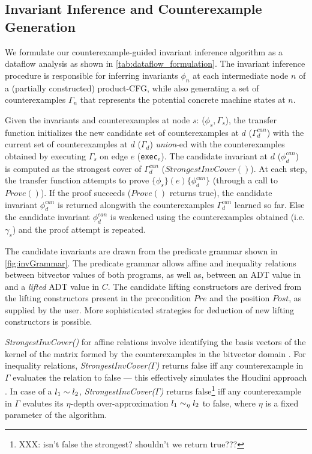 


\subsection{Invariant Inference and Counterexample Generation}
\label{sec:invinferalgo}
We formulate our counterexample-guided invariant inference algorithm as a dataflow analysis
as shown in \cref{tab:dataflow_formulation}.
The invariant inference procedure is responsible for inferring invariants $\phi_n$ at each intermediate
node $n$ of a (partially constructed) product-CFG, while also generating a set of counterexamples
$\Gamma_n$ that represents the potential concrete machine states at $n$.

Given the invariants and counterexamples at node $s$: ($\phi_s,\Gamma_s$),
the transfer function initializes the new candidate set of counterexamples at $d$ ($\Gamma^{can}_{d}$)
with the current set of counterexamples at $d$ ($\Gamma_{d}$) {\em union}-ed with
the counterexamples obtained by executing $\Gamma_s$ on edge $e$ ({\tt exec}$_e$).
The candidate invariant at $d$ ($\phi^{can}_d$) is computed as the strongest cover
of $\Gamma^{can}_{d}$ ($StrongestInvCover()$).
At each step, the transfer function attempts to prove $\{\phi_s\} (e) \{\phi^{can}_d\}$
(through a call to $Prove()$).
If the proof succeeds ($Prove()$ returns true), the candidate invariant $\phi^{can}_d$ is returned alongwith
the counterexamples $\Gamma^{can}_d$ learned so far.
Else the candidate invariant $\phi^{can}_d$ is weakened using the counterexamples obtained
(i.e. $\gamma_s$) and the proof attempt is repeated.

The candidate invariants are drawn from the predicate grammar shown in \cref{fig:invGrammar}.
The predicate grammar allows affine and inequality relations between bitvector values of both
programs, as well as, \recursiveRelations{} between an ADT value in \SpecL{} and a {\em lifted} ADT value in $C$.
The candidate lifting constructors are derived from the lifting constructors
present in the precondition $Pre$ and the position $Post$, as supplied by the user.
More sophisticated strategies for deduction of new lifting constructors is possible.

{\em StrongestInvCover()} for affine relations involve
identifying the basis vectors of the kernel of the
matrix formed by the counterexamples in the bitvector
domain \cite{esop05,semalign}.
For inequality relations, {\em StrongestInvCover($\Gamma$)}
returns false iff any counterexample in $\Gamma$ evaluates the
relation to false --- this effectively simulates the Houdini approach \cite{houdini}.
In case of a \recursiveRelation{} $l_1 \sim{} l_2$, {\em StrongestInvCover($\Gamma$)}
returns false\footnote{XXX: isn't false the strongest? shouldn't we return true???} iff any counterexample in $\Gamma$ evalutes its $\eta$-depth over-approximation
$l_1 \sim_\eta l_2$ to false, where $\eta$ is a fixed parameter of the algorithm.


